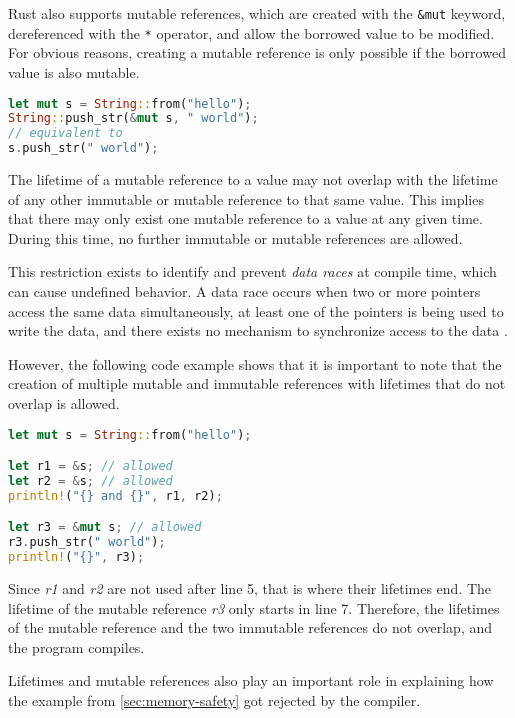 \documentclass[sigplan,11pt,nonacm]{acmart}
\begin{document}
Rust also supports mutable references, which are created with the \verb|&mut| keyword, dereferenced with the \verb|*| operator, and allow the borrowed value to be modified.
For obvious reasons, creating a mutable reference is only possible if the borrowed value is also mutable.

\begin{lstlisting}[language=Rust,captionpos=b,caption={Rust mutable String reference}]
let mut s = String::from("hello");
String::push_str(&mut s, " world");
// equivalent to
s.push_str(" world");
\end{lstlisting}

The lifetime of a mutable reference to a value may not overlap with the lifetime of any other immutable or mutable reference to that same value.
This implies that there may only exist one mutable reference to a value at any given time.
During this time, no further immutable or mutable references are allowed.

This restriction exists to identify and prevent \emph{data races} at compile time, which can cause undefined behavior.
A data race occurs when two or more pointers access the same data simultaneously, at least one of the pointers is being used to write the data, and there exists no mechanism to synchronize access to the data \cite{rust-book}.

However, the following code example \cite{rust-book} shows that it is important to note that the creation of multiple mutable and immutable references with lifetimes that do not overlap is allowed.

\begin{lstlisting}[language=Rust,captionpos=b,caption={Rust non-overlapping lifetimes}]
let mut s = String::from("hello");

let r1 = &s; // allowed
let r2 = &s; // allowed
println!("{} and {}", r1, r2);

let r3 = &mut s; // allowed
r3.push_str(" world");
println!("{}", r3);
\end{lstlisting}

Since \emph{r1} and \emph{r2} are not used after line 5, that is where their lifetimes end.
The lifetime of the mutable reference \emph{r3} only starts in line 7.
Therefore, the lifetimes of the mutable reference and the two immutable references do not overlap, and the program compiles.

Lifetimes and mutable references also play an important role in explaining how the example from \ref{sec:memory-safety} got rejected by the compiler.
\end{document}
